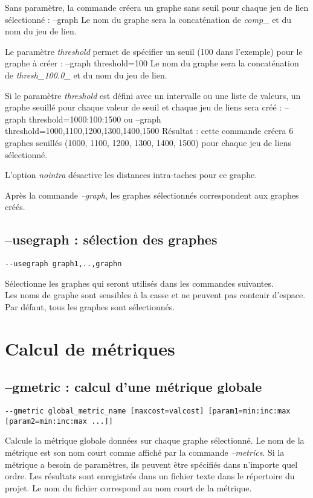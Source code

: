 \documentclass[a4paper,10pt]{report}
\newenvironment{cmd}
{\quote\Verbatim}
{\endVerbatim\endquote}
\begin{document}
Sans paramètre, la commande créera un graphe sans seuil pour chaque jeu de lien sélectionné :
\begin{cmd}
--graph
\end{cmd}
Le nom du graphe sera la concaténation de \textit{comp\_} et du nom du jeu de lien.

Le paramètre \textit{threshold} permet de spécifier un seuil (100 dans l'exemple) pour le graphe à créer :
\begin{cmd}
--graph threshold=100
\end{cmd}
Le nom du graphe sera la concaténation de  \textit{thresh\_100.0\_} et du nom du jeu de lien.

Si le paramètre \textit{threshold} est défini avec un intervalle ou une liste de valeurs, un graphe seuillé pour chaque valeur de seuil et chaque jeu de liens sera créé :
\begin{cmd}
--graph threshold=1000:100:1500
ou
--graph threshold=1000,1100,1200,1300,1400,1500
\end{cmd}
Résultat : cette commande créera 6 graphes seuillés (1000, 1100, 1200, 1300, 1400, 1500) pour chaque jeu de liens sélectionné.

L'option \textit{nointra} désactive les distances intra-taches pour ce graphe.

Après la commande \textit{--graph}, les graphes sélectionnés correspondent aux graphes créés.

\subsection{--usegraph : sélection des graphes}
\begin{verbatim}
--usegraph graph1,..,graphn
\end{verbatim}
Sélectionne les graphes qui seront utilisés dans les commandes suivantes.\\
Les noms de graphe sont sensibles à la casse et ne peuvent pas contenir d'espace.\\
Par défaut, tous les graphes sont sélectionnés.

\section{Calcul de métriques}

\subsection{--gmetric : calcul d'une métrique globale}
\begin{verbatim}
--gmetric global_metric_name [maxcost=valcost] [param1=min:inc:max [param2=min:inc:max ...]]
\end{verbatim}
Calcule la métrique globale données sur chaque graphe sélectionné.
Le nom de la métrique est son nom court comme affiché par la commande \textit{--metrics}.
Si la métrique a besoin de paramètres, ils peuvent être spécifiés dans n'importe quel ordre.
Les résultats sont enregistrés dans un fichier texte dans le répertoire du projet. Le nom du fichier correspond au nom court de la métrique.
\end{document}
